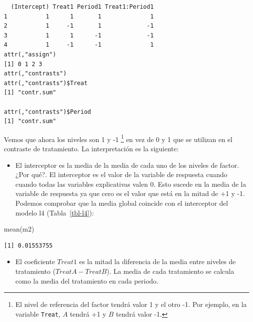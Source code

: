 \documentclass[
  12pt,
  a4paper,
  extrafontsizes,
  onecolumn,
  openright]{memoir}
\newenvironment{Shaded}{\begin{snugshade}}{\end{snugshade}}
\newcommand{\FunctionTok}[1]{\textcolor[rgb]{0.28,0.35,0.67}{#1}}
\newcommand{\NormalTok}[1]{\textcolor[rgb]{0.00,0.23,0.31}{#1}}
\providecommand{\tightlist}{%
  \setlength{\itemsep}{0pt}\setlength{\parskip}{0pt}}\usepackage{longtable,booktabs,array}
\begin{document}
\begin{verbatim}
  (Intercept) Treat1 Period1 Treat1:Period1
1           1      1       1              1
2           1     -1       1             -1
3           1      1      -1             -1
4           1     -1      -1              1
attr(,"assign")
[1] 0 1 2 3
attr(,"contrasts")
attr(,"contrasts")$Treat
[1] "contr.sum"

attr(,"contrasts")$Period
[1] "contr.sum"
\end{verbatim}

\normalsize

Vemos que ahora los niveles son 1 y -1 \footnote{El nivel de referencia
  del factor tendrá valor 1 y el otro -1. Por ejemplo, en la variable
  \texttt{Treat}, \(A\) tendrá +1 y \(B\) tendrá valor -1.} en vez de 0
y 1 que se utilizan en el contraste de tratamiento. La interpretación es
la siguiente:

\begin{itemize}
\tightlist
\item
  El interceptor es la media de la media de cada uno de los niveles de
  factor. ¿Por qué?. El interceptor es el valor de la variable de
  respuesta cuando cuando todas las variables explicativas valen 0. Esto
  sucede en la media de la variable de respuesta ya que cero es el valor
  que está en la mitad de +1 y -1. Podemos comprobar que la media global
  coincide con el interceptor del modelo l4 (Tabla~\ref{tbl-l4}):
\end{itemize}

\scriptsize

\begin{Shaded}
\begin{Highlighting}[]
\FunctionTok{mean}\NormalTok{(m2)}
\end{Highlighting}
\end{Shaded}

\begin{verbatim}
[1] 0.01553755
\end{verbatim}

\normalsize

\begin{itemize}
\tightlist
\item
  El coeficiente \(Treat1\) es la mitad la diferencia de la media entre
  niveles de tratamiento (\(TreatA-TreatB\)). La media de cada
  tratamiento se calcula como la media del tratamiento en cada periodo.
\end{itemize}

\scriptsize
\end{document}
